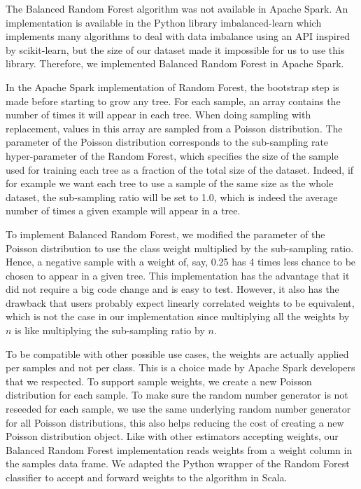 \documentclass[conference]{IEEEtran}
\begin{document}
The Balanced Random Forest algorithm was not available in Apache Spark.
An implementation is available in the Python library
imbalanced-learn\cite{imbalance} which implements many algorithms to deal
with data imbalance using an API inspired by scikit-learn\cite{imbalance}, but the size of
our dataset made it impossible for us to use this library. Therefore, we
implemented Balanced Random Forest in Apache Spark.

In the Apache Spark implementation of Random Forest, the bootstrap step is
made before starting to grow any tree. For each sample, an array contains
the number of times it will appear in each tree. When doing sampling with
replacement, values in this array are sampled from a Poisson distribution.
The parameter of the Poisson distribution corresponds to the sub-sampling
rate hyper-parameter of the Random Forest, which specifies the size of the
sample used for training each tree as a fraction of the total size of the
dataset. Indeed, if for example we want each tree to use a sample of the
same size as the whole dataset, the sub-sampling ratio will be set to 1.0,
which is indeed the average number of times a given example will appear in a tree.

To implement Balanced Random Forest, we modified the parameter of
the Poisson distribution to use the class weight multiplied by the
sub-sampling ratio. Hence, a negative sample with a weight
of, say, 0.25 has 4 times less chance to be chosen to appear in a given tree. This
implementation has the advantage that it did not require a big code change
and is easy to test. However, it also has the drawback that users probably
expect linearly correlated weights to be equivalent, which is not the case
in our implementation since multiplying all the weights by $n$ is like multiplying
the sub-sampling ratio by $n$.

To be compatible with other possible use cases, the weights are
actually applied per samples and not per class. This is a choice made by
Apache Spark developers that we respected. To support sample
weights, we create a new Poisson distribution for each sample. To make sure
the random number generator is not reseeded for each sample, we use the
same underlying random number generator for all Poisson distributions, this
also helps reducing the cost of creating a new Poisson distribution object.
Like with other estimators accepting weights, our Balanced Random Forest
implementation reads weights from a weight column in the samples data frame.
We adapted the Python wrapper of the Random Forest classifier to accept and
forward weights to the algorithm in Scala.
\end{document}

